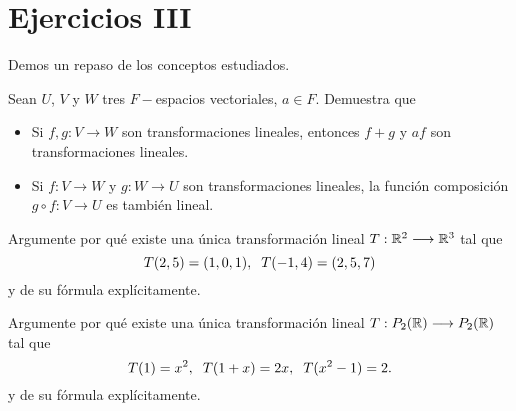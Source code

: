 \section{Ejercicios III}

Demos un repaso de los conceptos estudiados.



\begin{ej}
	\label{ej: operaciones entre lineales}
Sean $U$, $V$ y $W$ tres $F-$espacios vectoriales, $a \in F$.
Demuestra que
\begin{itemize}
	\item Si $f, g: V \longrightarrow W$ son transformaciones lineales, 
	entonces $f+g$ y $af$ son transformaciones lineales.
	\item Si $f: V \longrightarrow W$ y $g: W \longrightarrow U$
	son transformaciones lineales, la función composición
	$g \circ f : V \longrightarrow U$ es también lineal.
\end{itemize}
\end{ej}

\begin{ej}
Argumente por qué
existe una única transformación lineal $T: \mathbb{R}^{2} \longrightarrow \mathbb{R}^{3}$
tal que 
\[
T(2, 5) = (1, 0, 1), \hspace{0.2cm}
T(-1, 4) = (2, 5, 7)
\]
y de su fórmula explícitamente.
\end{ej}

\begin{ej}
Argumente por qué
existe una única transformación lineal $T: P_{2}(\mathbb{R}) \longrightarrow 
P_{2}(\mathbb{R})$
tal que 
\[
T(1) = x^{2}, \hspace{0.2cm}
T(1+x) = 2x, \hspace{0.2cm}
T(x^{2}-1) = 2.
\]
y de su fórmula explícitamente.
\end{ej}

\newpage